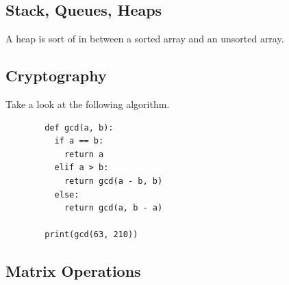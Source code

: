 \documentclass{article}
\begin{document}
    \begin{definition}

    \end{definition}

    \begin{definition}
      
    \end{definition}

  \subsection{Stack, Queues, Heaps}

    A heap is sort of in between a sorted array and an unsorted array. 

  \subsection{Cryptography} 

    \begin{example}
      Take a look at the following algorithm. 
      \begin{lstlisting}
        def gcd(a, b): 
          if a == b: 
            return a
          elif a > b: 
            return gcd(a - b, b) 
          else: 
            return gcd(a, b - a)

        print(gcd(63, 210))
      \end{lstlisting}
    \end{example}

    \begin{definition}
      
    \end{definition}

    \begin{definition}
      
    \end{definition}

  \subsection{Matrix Operations}

    \begin{definition}
      
    \end{definition}

    \begin{definition}
      
    \end{definition}
\end{document}
